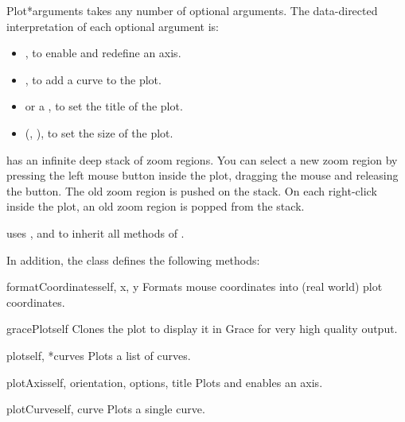 \documentclass{manual}
\begin{document}
\begin{classdesc}{Plot}{*arguments}
   takes any number of optional arguments.
  The data-directed interpretation of each optional argument is:
  \begin{itemize}
  \item
    , to enable and redefine an axis.
  \item
    , to add a curve to the plot.
  \item
     or a , to set the title of the plot.
  \item
    (, ), to set the size of the plot.
  \end{itemize}

   has an infinite deep stack of zoom regions.
  You can select a new zoom region by pressing the left mouse button
  inside the plot, dragging the mouse and releasing the button.
  The old zoom region is pushed on the stack.
  On each right-click inside the plot, an old zoom region is
  popped from the stack.

   uses ,  and
   to inherit all methods of .
\end{classdesc}

In addition, the class  defines the following methods:

\begin{methoddesc}[Plot]{formatCoordinates}{self, x, y}
Formats mouse coordinates into (real world) plot coordinates.
\end{methoddesc}

\begin{methoddesc}[Plot]{gracePlot}{self}
Clones the plot to display it in Grace for very high quality output.
\end{methoddesc}

\begin{methoddesc}[Plot]{plot}{self, *curves}
Plots a list of curves.
\end{methoddesc}

\begin{methoddesc}[Plot]{plotAxis}{self, orientation, options, title}
Plots and enables an axis.
\end{methoddesc}

\begin{methoddesc}[Plot]{plotCurve}{self, curve}
Plots a single curve.
\end{methoddesc}
\end{document}

